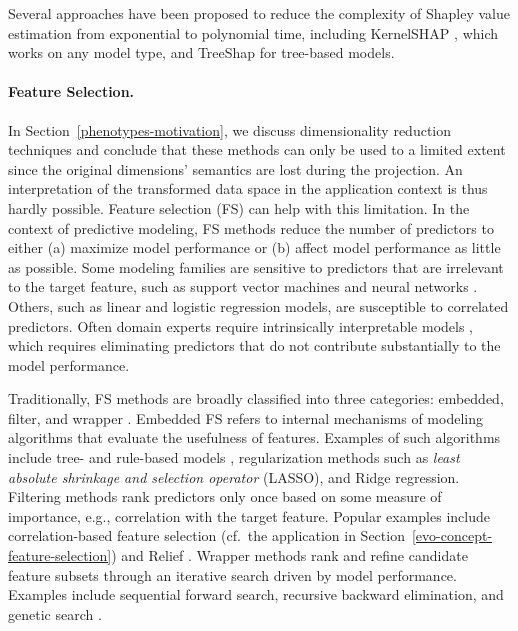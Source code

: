 \documentclass[
  oneside]{book}
\begin{document}
Several approaches have been proposed to reduce the complexity of Shapley value estimation from exponential to polynomial time, including KernelSHAP \autocite{Lundberg:SHAP2017}, which works on any model type, and TreeShap \autocite{Lundberg:TreeSHAP2019} for tree-based models.

\paragraph*{Feature Selection.}

In Section~\ref{phenotypes-motivation}, we discuss dimensionality reduction techniques and conclude that these methods can only be used to a limited extent since the original dimensions' semantics are lost during the projection.
An interpretation of the transformed data space in the application context is thus hardly possible.
Feature selection (FS) can help with this limitation.
In the context of predictive modeling, FS methods reduce the number of predictors to either (a) maximize model performance or (b) affect model performance as little as possible.
Some modeling families are sensitive to predictors that are irrelevant to the target feature, such as support vector machines \autocite{Boser:SVM1992} and neural networks \autocite{nnet,Goodfellow:DL2016}.
Others, such as linear and logistic regression models, are susceptible to correlated predictors.
Often domain experts require intrinsically interpretable models \autocite{tonekaboni2019clinicians}, which requires eliminating predictors that do not contribute substantially to the model performance.

Traditionally, FS methods are broadly classified into three categories: embedded, filter, and wrapper \autocite{Guyon:RFE2003}.
Embedded FS refers to internal mechanisms of modeling algorithms that evaluate the usefulness of features.
Examples of such algorithms include tree- and rule-based models \autocite{Quinlan:C451993,kuhn2013applied}, regularization methods such as \emph{least absolute shrinkage and selection operator} \autocite{lasso} (LASSO), and Ridge \autocite{ridge} regression.
Filtering methods rank predictors only once based on some measure of importance, e.g., correlation with the target feature.
Popular examples include correlation-based feature selection \autocite{Hall:CFS2000} (cf.~the application in Section~\ref{evo-concept-feature-selection}) and Relief \autocite{kira1992feature}.
Wrapper methods rank and refine candidate feature subsets through an iterative search driven by model performance.
Examples include sequential forward search, recursive backward elimination, and genetic search \autocite{chandrashekar2014survey}.
\end{document}
